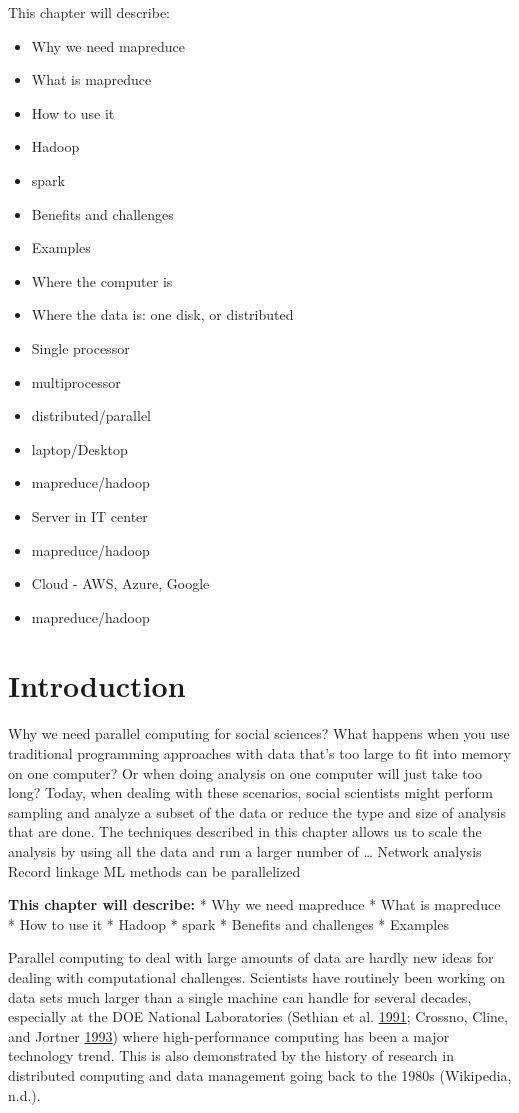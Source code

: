 \documentclass[]{krantz}
\begin{document}
This chapter will describe:

\begin{itemize}
\item
  Why we need mapreduce
\item
  What is mapreduce
\item
  How to use it
\item
  Hadoop
\item
  spark
\item
  Benefits and challenges
\item
  Examples
\item
  Where the computer is
\item
  Where the data is: one disk, or distributed
\item
  Single processor
\item
  multiprocessor
\item
  distributed/parallel
\item
  laptop/Desktop
\item
  mapreduce/hadoop
\item
  Server in IT center
\item
  mapreduce/hadoop
\item
  Cloud - AWS, Azure, Google
\item
  mapreduce/hadoop
\end{itemize}

\section{Introduction}\label{introduction-1}

Why we need parallel computing for social sciences? What happens when
you use traditional programming approaches with data that's too large to
fit into memory on one computer? Or when doing analysis on one computer
will just take too long? Today, when dealing with these scenarios,
social scientists might perform sampling and analyze a subset of the
data or reduce the type and size of analysis that are done. The
techniques described in this chapter allows us to scale the analysis by
using all the data and run a larger number of \ldots{} Network analysis
Record linkage ML methods can be parallelized

\textbf{This chapter will describe:} * Why we need mapreduce * What is
mapreduce * How to use it * Hadoop * spark * Benefits and challenges *
Examples

Parallel computing to deal with large amounts of data are hardly new
ideas for dealing with computational challenges. Scientists have
routinely been working on data sets much larger than a single machine
can handle for several decades, especially at the DOE National
Laboratories (Sethian et al. \protect\hyperlink{ref-bigdata_old1}{1991};
Crossno, Cline, and Jortner
\protect\hyperlink{ref-crossno1993heterogeneous}{1993}) where
high-performance computing has been a major technology trend. This is
also demonstrated by the history of research in distributed computing
and data management going back to the 1980s (Wikipedia, n.d.).
\end{document}
